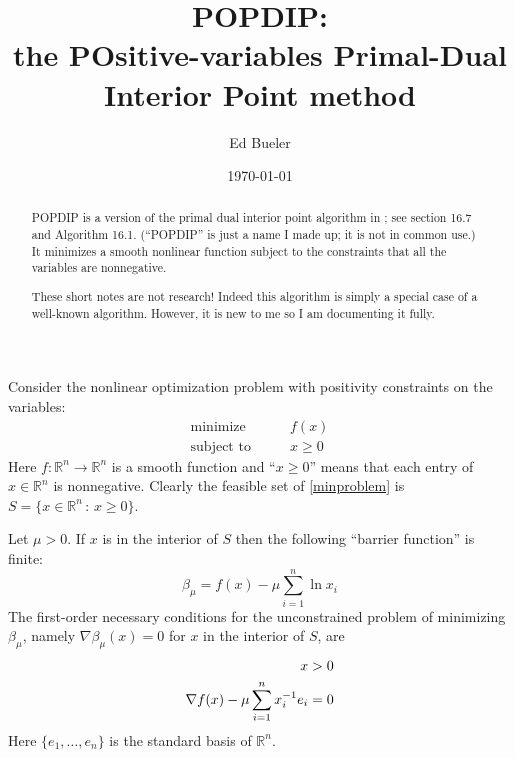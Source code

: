 \documentclass[11pt]{article}
\title{POPDIP: \\ the POsitive-variables Primal-Dual Interior Point method}
\author{Ed Bueler}
\date{\today}
\newcommand{\RR}{\mathbb{R}}
\newcommand{\grad}{\nabla}
\begin{document}
\maketitle

\begin{abstract}
POPDIP is a version of the primal dual interior point algorithm in \cite{GrivaNashSofer2009}; see section 16.7 and Algorithm 16.1.  (``POPDIP'' is just a name I made up; it is not in common use.)  It minimizes a smooth nonlinear function subject to the constraints that all the variables are nonnegative.

These short notes are not research!  Indeed this algorithm is simply a special case of a well-known algorithm.  However, it is new to me so I am documenting it fully.
\end{abstract}

\thispagestyle{empty}

\bigskip
Consider the nonlinear optimization problem with positivity constraints on the variables:
\begin{equation}
\begin{matrix}
\text{minimize} \qquad & f(x) \\
\text{subject to} \qquad & x \ge 0
\end{matrix} \label{minproblem}
\end{equation}
Here $f:\RR^n\to\RR^n$ is a smooth function and ``$x\ge 0$'' means that each entry of $x\in\RR^n$ is nonnegative.  Clearly the feasible set of \eqref{minproblem} is $S = \{x\in \RR^n\,:\,x\ge 0\}$.

Let $\mu>0$.  If $x$ is in the interior of $S$ then the following ``barrier function'' is finite:
\begin{equation}
\beta_\mu = f(x) - \mu \sum_{i=1}^n \ln x_i \label{barrierfunction}
\end{equation}
The first-order necessary conditions for the unconstrained problem of minimizing $\beta_\mu$, namely $\grad \beta_\mu(x)=0$ for $x$ in the interior of $S$, are
\begin{align}
x &> 0 \label{firstorderbarrier} \\
\grad f(x) - \mu \sum_{i=1}^n x_i^{-1} e_i &= 0 \notag
\end{align}
Here $\{e_1,\dots,e_n\}$ is the standard basis of $\RR^n$.
\end{document}
